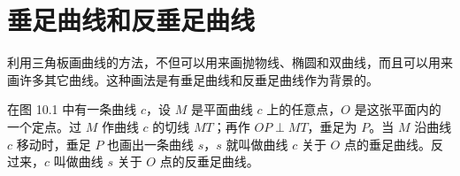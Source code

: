 \section{垂足曲线和反垂足曲线}

利用三角板画曲线的方法，不但可以用来画抛物线、椭圆和双曲线，而且可以用来画许多其它曲线。这种画法是有垂足曲线和反垂足曲线作为背景的。

\noindent
\begin{minipage}[t]{0.53\textwidth}
  \setlength{\parindent}{2em}
  在图 10.1 中有一条曲线 $c$，设 $M$ 是平面曲线 $c$ 上的任意点，$O$ 是这张平面内的一个定点。过 $M$ 作曲线 $c$ 的切线 $MT$；再作 $OP \perp MT$，垂足为 $P$。当 $M$ 沿曲线 $c$ 移动时，垂足 $P$ 也画出一条曲线 $s$，$s$ 就叫做曲线 $c$ 关于 $O$ 点的垂足曲线。反过来，$c$ 叫做曲线 $s$ 关于 $O$ 点的反垂足曲线。
\end{minipage}
\hfill
